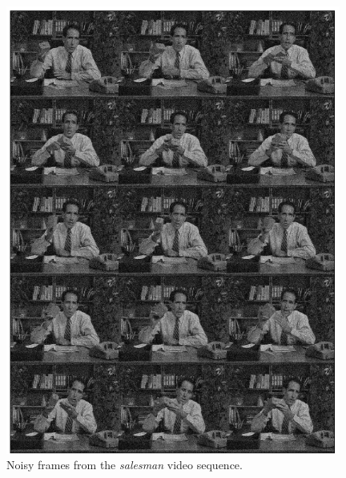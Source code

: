 \documentclass[twoside,11pt]{article}
\numberwithin{equation}{section}
\numberwithin{theorem}{section}
\begin{document}
\begin{figure}[p]
 \centering
 \includegraphics[width = 0.98\textwidth]{salesman-Noisy}
 \caption{
  \label{fig:videoNoisy}
  Noisy frames from the {\it salesman} video sequence.
 }
\end{figure}
\end{document}

